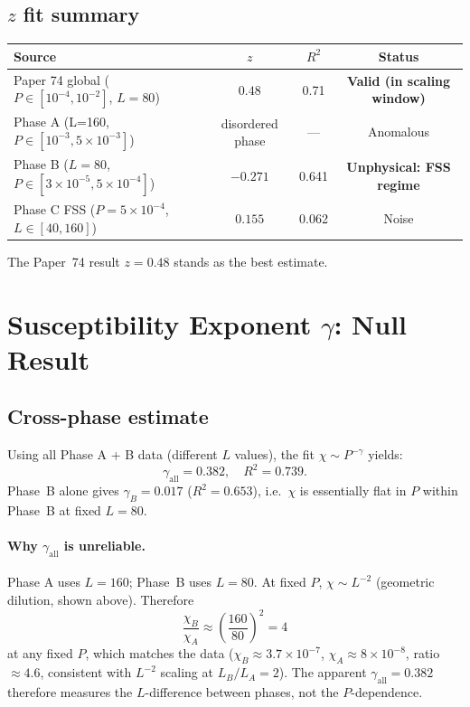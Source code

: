 \documentclass[12pt,a4paper]{article}
\begin{document}
\subsection{$z$ fit summary}

\begin{center}
\begin{tabular}{lccc}
\toprule
Source & $z$ & $R^2$ & Status \\
\midrule
Paper 74 global ($P\in[10^{-4},10^{-2}]$, $L=80$) & $0.48$ & 0.71 & \textbf{Valid (in scaling window)} \\
Phase A (L=160, $P\in[10^{-3},5\times10^{-3}]$)    & disordered phase & --- & Anomalous \\
Phase B ($L=80$, $P\in[3\times10^{-5},5\times10^{-4}]$) & $-0.271$ & 0.641 & \textbf{Unphysical: FSS regime} \\
Phase C FSS ($P=5\times10^{-4}$, $L\in[40,160]$)   & $0.155$ & 0.062 & Noise \\
\bottomrule
\end{tabular}
\end{center}

The Paper~74 result $z=0.48$ stands as the best estimate.

\section{Susceptibility Exponent $\gamma$: Null Result}

\subsection{Cross-phase estimate}

Using all Phase A + B data (different $L$ values), the fit $\chi \sim P^{-\gamma}$ yields:
\begin{equation}
  \gamma_\mathrm{all} = 0.382, \quad R^2 = 0.739.
\end{equation}
Phase~B alone gives $\gamma_B = 0.017$ ($R^2=0.653$), i.e.\ $\chi$ is essentially flat in $P$
within Phase~B at fixed $L=80$.

\paragraph{Why $\gamma_\mathrm{all}$ is unreliable.}
Phase A uses $L=160$; Phase~B uses $L=80$.  At fixed $P$, $\chi \sim L^{-2}$
(geometric dilution, shown above).  Therefore
\begin{equation}
  \frac{\chi_B}{\chi_A} \approx \left(\frac{160}{80}\right)^2 = 4
\end{equation}
at any fixed $P$, which matches the data ($\chi_B \approx 3.7\times10^{-7}$,
$\chi_A \approx 8\times10^{-8}$, ratio $\approx 4.6$, consistent with $L^{-2}$ scaling
at $L_B/L_A=2$).  The apparent $\gamma_\mathrm{all}=0.382$ therefore measures the
$L$-difference between phases, not the $P$-dependence.
\end{document}
